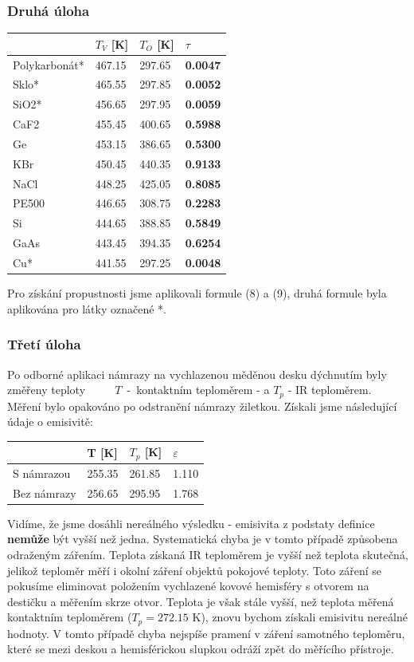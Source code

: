 \documentclass[czech,11pt,a4paper]{article}
\begin{document}
	\subsubsection{Druhá úloha}
	\begin{center}
		\begin{tabular}{l|l|l|l}
		& $T_V$ [K]  & $T_O$ [K]  & $\tau$         \\ \hline
		Polykarbonát* & 467.15 & 297.65 & \textbf{0.0047} \\ \hline
		Sklo*         & 465.55 & 297.85 & \textbf{0.0052} \\ \hline
		SiO2*         & 456.65 & 297.95 & \textbf{0.0059} \\ \hline
		CaF2          & 455.45 & 400.65 & \textbf{0.5988} \\ \hline
		Ge            & 453.15 & 386.65 & \textbf{0.5300} \\ \hline
		KBr           & 450.45 & 440.35 & \textbf{0.9133} \\ \hline
		NaCl          & 448.25 & 425.05 & \textbf{0.8085} \\ \hline
		PE500         & 446.65 & 308.75 & \textbf{0.2283} \\ \hline
		Si            & 444.65 & 388.85 & \textbf{0.5849} \\ \hline
		GaAs          & 443.45 & 394.35 & \textbf{0.6254} \\ \hline
		Cu*           & 441.55 & 297.25 & \textbf{0.0048}
	\end{tabular}
	\end{center}
	Pro získání propustnosti jsme aplikovali formule (8) a (9), druhá formule byla aplikována pro látky označené *.
	\subsubsection{Třetí úloha}
	Po odborné aplikaci námrazy na vychlazenou měděnou desku dýchnutím byly změřeny teploty \,\,\, \,\,\,\,\,\,\, $T$~-~kontaktním teploměrem - a $T_p$ - IR teploměrem. Měření bylo opakováno po odstranění námrazy žiletkou. Získali jsme následující údaje o emisivitě:
\begin{center}
		\begin{tabular}{l|l|l|l}
		& T [K]  & $T_p$ [K] & $\varepsilon$ \\ \hline
		S námrazou  & 255.35 & 261.85    & 1.110         \\\hline
		Bez námrazy & 256.65 & 295.95    & 1.768       
	\end{tabular}
\end{center}
	Vidíme, že jsme dosáhli nereálného výsledku - emisivita z podstaty definice \textbf{nemůže} být vyšší než jedna. Systematická chyba je v tomto případě způsobena odraženým zářením. Teplota získaná IR teploměrem je vyšší než teplota skutečná, jelikož teploměr měří i okolní záření objektů pokojové teploty. Toto záření se pokusíme eliminovat položením vychlazené kovové hemisféry s otvorem na destičku a měřením skrze otvor. Teplota je však stále vyšší, než teplota měřená kontaktním teploměrem ($T_p = 272.15$ K), znovu bychom získali emisivitu nereálné hodnoty. V tomto případě chyba nejspíše pramení v záření samotného teploměru, které se mezi deskou a hemisférickou slupkou odráží zpět do měřícího přístroje.
\end{document}
